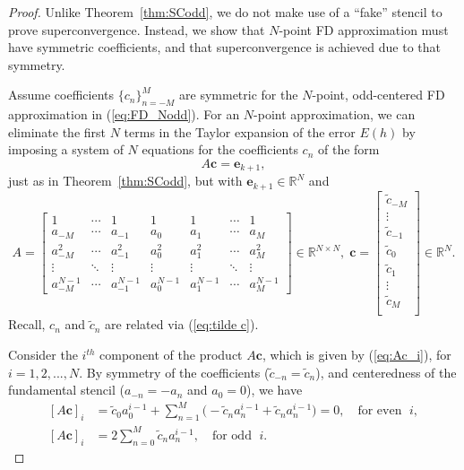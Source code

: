\documentclass[12pt]{article}
\newcommand{\R}{\mathbb{R}}
\begin{document}
\begin{proof} 
Unlike Theorem~\ref{thm:SCodd}, we do not make use of a ``fake'' stencil to prove superconvergence.
Instead, we show that $N$-point FD approximation must have symmetric coefficients, and that superconvergence is achieved due to that symmetry.

Assume coefficients $\{c_n\}_{n=-M}^M$ are symmetric for the $N$-point, odd-centered FD approximation in (\ref{eq:FD_Nodd}).
For an $N$-point approximation, we can eliminate the first $N$ terms in the Taylor expansion of the error $E(h)$ by imposing a system of $N$ equations for the coefficients $c_n$ of the form
\begin{equation}\label{eq:Ac=e,even}
	A\mathbf c = \mathbf e_{k+1},
\end{equation}
just as in Theorem~\ref{thm:SCodd}, but with $\mathbf e_{k+1}\in\R^N$ and 
\begin{equation}\label{eq:MatAEO}
	A =
	\begin{bmatrix}
		1 &\cdots &1 & 1  & 1 & \cdots & 1\\
		a_{-M}& \cdots& a_{-1}&a_0 & a_1  & \cdots & a_M\\
		a_{-M}^2& \cdots&  a_{-1}^2&a_0^2 & a_1^2  & \cdots & a_M^2\\
		\vdots & \ddots & \vdots & \vdots & \vdots& \ddots & \vdots\\
		a_{-M}^{N-1}&\cdots & a_{-1}^{N-1} &a_0^{N-1} & a_1^{N-1} & \cdots & a_M^{N-1}
	\end{bmatrix} \in\R^{N\times N},
	\;
	\mathbf c = \begin{bmatrix}
		\tilde c_{-M}\\ \vdots \\ \tilde c_{-1}\\ \tilde c_0\\ \tilde c_1\\ \vdots \\ \tilde c_{M}\\
	\end{bmatrix}\in\R^N.
\end{equation}
Recall, $c_n$ and $\tilde c_n$ are related via (\ref{eq:tilde c}).

Consider the $i^{th}$ component of the product $A\mathbf c$, which is given by (\ref{eq:Ac_i}), for $i=1,2,...,N$.
By symmetry of the coefficients ($\tilde c_{-n}=\tilde c_n$), and centeredness of the fundamental stencil ($a_{-n}=-a_n$ and $a_0=0$), we have
\begin{subequations}
\begin{align}
	[A\mathbf c]_i &= \tilde c_0a_0^{i-1} + \sum_{n=1}^M \Big( -\tilde c_{n}a_{n}^{i-1}+\tilde c_n a_{n}^{i-1}\Big) = 0, \quad \text{for even }\; i, \label{eq:Ac=0 even}\\
	[A\mathbf c]_i &= 2\sum_{n=0}^M \tilde c_n a_{n}^{i-1}, \quad \text{for odd } \; i. \label{eq:Ac=2 even}
\end{align}
\end{subequations}


\end{proof}
\end{document}
